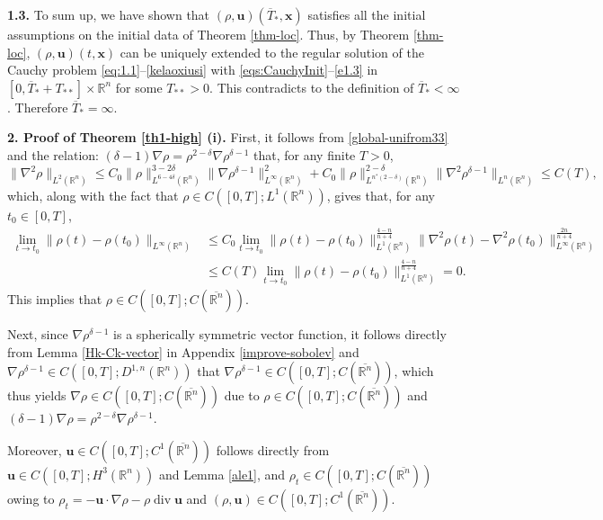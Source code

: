 \documentclass[11pt,reqno]{amsart}
\DeclareMathOperator{\diver}{\mathrm{div}}
\numberwithin{rk}{section}
\numberwithin{prop}{section}
\numberwithin{mydef}{section}
\numberwithin{lem}{section}
\numberwithin{equation}{section}
\numberwithin{thm}{section}
\begin{document}
\smallskip
\textbf{1.3.}
To sum up, we have shown that $(\rho,\boldsymbol{u})(\overline{T}_*,\boldsymbol{x})$ satisfies all the initial assumptions on the initial data of Theorem \ref{thm-loc}. 
Thus, by Theorem \ref{thm-loc}, $(\rho, \boldsymbol{u})(t,\boldsymbol{x})$ can be uniquely extended to the  regular solution of the Cauchy problem \eqref{eq:1.1}--\eqref{kelaoxiusi} with \eqref{eqs:CauchyInit}--\eqref{e1.3} in  $[0,\overline{T}_*+T_{**}]\times \mathbb{R}^n$ for some $T_{**}>0$. This  contradicts to the definition  of $\overline{T}_*<\infty$. Therefore $\overline{T}_*=\infty$.




\smallskip
\textbf{2. Proof of Theorem \ref{th1-high} (i).}  First, it follows  from \eqref{global-unifrom33} and the relation:  
$(\delta-1)\nabla \rho=\rho^{2-\delta} \nabla \rho^{\delta-1}$ that, for any finite  $T>0$,
\begin{equation*}
\|\nabla^2\rho\|_{L^2(\mathbb{R}^n)} \leq C_0\|\rho\|_{L^{6-4\delta}(\mathbb{R}^n)}^{3-2\delta}\|\nabla\rho^{\delta-1}\|_{L^\infty(\mathbb{R}^n)}^2 +C_0\|\rho\|_{L^{n^*(2-\delta)}(\mathbb{R}^n)}^{2-\delta}\!\|\nabla^2\rho^{\delta-1}\|_{L^n(\mathbb{R}^n)}\leq C(T),
\end{equation*}
which, along with the fact that $\rho \in C([0,T];L^1(\mathbb{R}^n))$, gives that, for any $t_0\in [0,T]$,
\begin{equation*} 
\begin{aligned}
\lim_{t\to t_0}\|\rho(t)-\rho(t_0)\|_{L^\infty(\mathbb{R}^n)}&\leq C_0\lim_{t\to t_0}\|\rho(t)-\rho(t_0)\|_{L^1(\mathbb{R}^n)}^\frac{4-n}{n+4}\|\nabla^2\rho(t)-\nabla^2\rho(t_0)\|_{L^\infty(\mathbb{R}^n)}^\frac{2n}{n+4}\\
&\leq C(T)\lim_{t\to t_0}\|\rho(t)-\rho(t_0)\|_{L^1(\mathbb{R}^n)}^\frac{4-n}{n+4}=0. 
\end{aligned}
\end{equation*}
This implies that $\rho\in C([0,T];C(\overline{\mathbb{R}^n}))$. 
 
  
Next, since $\nabla\rho^{\delta-1}$ is a spherically symmetric vector function, it follows directly from Lemma \ref{Hk-Ck-vector} in Appendix \ref{improve-sobolev} and $\nabla\rho^{\delta-1}\in C([0,T];D^{1,n}(\mathbb{R}^n))$ that $\nabla\rho^{\delta-1}\in C([0,T];C(\overline{\mathbb{R}^n}))$, which thus yields $\nabla\rho\in C([0,T];C(\overline{\mathbb{R}^n}))$ due to  $\rho\in C([0,T];C(\overline{\mathbb{R}^n}))$ and $(\delta-1)\nabla \rho=\rho^{2-\delta} \nabla \rho^{\delta-1}$. 


Moreover, $\boldsymbol{u}\in C([0,T];C^1(\overline{\mathbb{R}^n}))$ follows directly from $\boldsymbol{u}\in C([0,T];H^3(\mathbb{R}^n))$ and  Lemma \ref{ale1}, and $\rho_t\in C([0,T];C(\overline{\mathbb{R}^n}))$ owing to $\rho_t=-\boldsymbol{u}\cdot\nabla \rho -\rho \diver\boldsymbol{u}$ and $(\rho,\boldsymbol{u})\in C([0,T];C^1(\overline{\mathbb{R}^n}))$.
\end{document}
